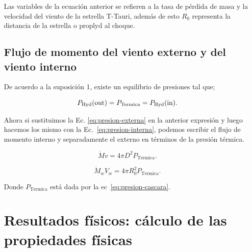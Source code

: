 Las variables de la ecuación anterior se refieren a la tasa de pérdida de masa y la velocidad del viento de la estrella T-Tauri, además de esto \(R_{0}\) representa la distancia de la estrella o proplyd al choque.

\subsection{Flujo de momento  del viento externo  y del viento interno }
\label{sec:momento}

De acuerdo a la suposición 1, existe un equilibrio de presiones tal que;
 
\begin{equation}
  \label{eq:igualda-presion}
  P_{\text{Hyd}}(\mathrm{out}{})=P_{\text{Termica}}=P_{\text{Hyd}}(\mathrm{in}{}).
\end{equation}

Ahora si sustituimos la Ec. \ref{eq:presion-externa} en la anterior expresión y luego hacemos los mismo con la Ec.~\ref{eq:presion-interna}, podemos escribir el flujo de momento interno y separadamente el externo en términos de la presión térmica. 

\begin{equation}
  \label{eq:momentum-out}
   \dot{M}v = 4 \pi  D^{2}  P_{\text{Termica}}. 
\end{equation}


\begin{equation}
  \label{eq:momentum}
   \dot{M}_{w}V_{w} = 4 \pi  R_{0}^{2}  P_{\text{Termica}}. 
\end{equation}

Donde \(P_{\text{Termica}}\) está dada por la ec~\ref{eq:presion-cascara}. 

\section{Resultados físicos: cálculo de las propiedades físicas }
\label{sec:results}

